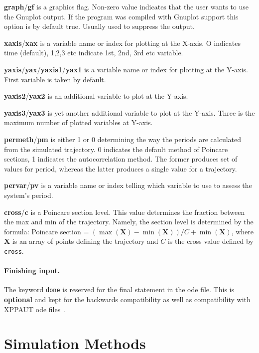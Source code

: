 \documentclass[11pt,a4paper]{article}
\begin{document}
\textbf{graph}/\textbf{gf} is a graphics flag. Non-zero value indicates that the user
wants to use the Gnuplot output. If the program was compiled with Gnuplot support
this option is by default true. Usually used to suppress the output.

\textbf{xaxis}/\textbf{xax} is a variable name or index for plotting at the X-axis. O
indicates time (default), 1,2,3 etc indicate 1st, 2nd, 3rd etc variable.

\textbf{yaxis}/\textbf{yax}/\textbf{yaxis1}/\textbf{yax1} is a variable name or index
for plotting at the Y-axis. First variable is taken by default.

\textbf{yaxis2}/\textbf{yax2} is an additional variable to plot at the Y-axis.

\textbf{yaxis3}/\textbf{yax3} is yet another additional variable to plot at the
Y-axis. Three is the maximum number of plotted variables at Y-axis.

\textbf{permeth}/\textbf{pm} is either 1 or 0 determining the way the periods are
calculated from the simulated trajectory. 0 indicates the default method of Poincare
sections, 1 indicates the autocorrelation method. The former produces set of values
for period, whereas the latter produces a single value for a trajectory.

\textbf{pervar}/\textbf{pv} is a variable name or index telling which variable to use
to assess the system's period.

\textbf{cross}/\textbf{c} is a Poincare section level. This value determines the
fraction between the max and min of the trajectory. Namely, the section level is
determined by the formula: Poincare section = $(\max(\mathbf{X}) - \min(\mathbf{X}))/C
+ \min(\mathbf{X})$, where $\mathbf{X}$ is an array of points defining the trajectory
and $C$ is the cross value defined by \verb-cross-.


\paragraph{Finishing input.}
\label{sec:finishing-input}

The keyword \verb-done- is reserved for the final statement in the ode file. This is
\textbf{optional} and kept for the backwards compatibility as well as compatibility
with XPPAUT ode files~\cite{XppautLink}.

\section{Simulation Methods}
\label{sec:simulation-methods}
\end{document}
